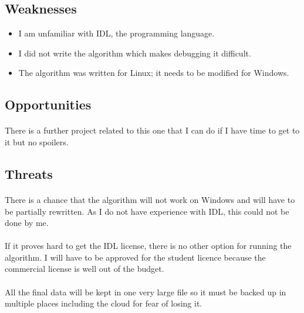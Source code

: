 \documentclass{article}
\begin{document}
\subsection{Weaknesses}

\begin{itemize}
\item I am unfamiliar with IDL, the programming language.
\item I did not write the algorithm which makes debugging it difficult.
\item The algorithm was written for Linux; it needs to be modified for Windows. 
\end{itemize}


\subsection{Opportunities}
\paragraph{}
There is a further project related to this one that I can do if I have time to get to it but no spoilers.

\subsection{Threats}
\paragraph{}
There is a chance that the algorithm will not work on Windows and will have to be partially rewritten. As I do not have experience with IDL, this could not be done by me. 
\paragraph{}
If it proves hard to get the IDL license, there is no other option for running the algorithm. I will have to be approved for the student licence because the commercial license is well out of the budget. 
\paragraph{}
All the final data will be kept in one very large file so it must be backed up in multiple places including the cloud for fear of losing it. 

\begin{appendix}
\listoffigures
\end{appendix}
\end{document}
